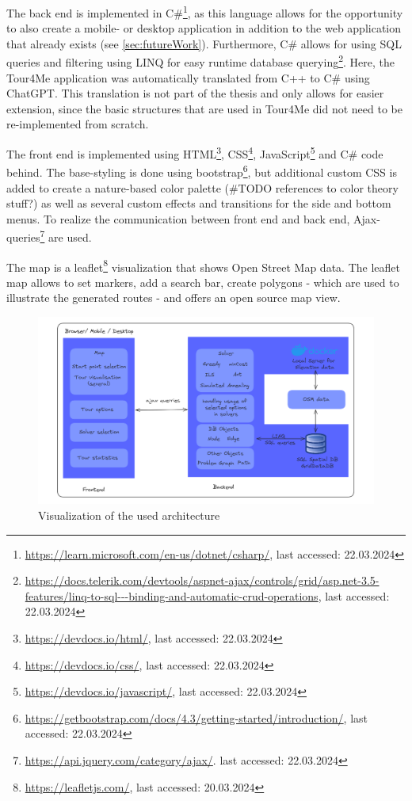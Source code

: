 The back end is implemented in C\#\footnote{\url{https://learn.microsoft.com/en-us/dotnet/csharp/}, last accessed: 22.03.2024}, as this language allows for the opportunity to also create a mobile- or desktop application in addition to the web application that already exists (see \ref{sec:futureWork}).
Furthermore, C\# allows for using SQL queries and filtering using LINQ for easy runtime database querying\footnote{\url{https://docs.telerik.com/devtools/aspnet-ajax/controls/grid/asp.net-3.5-features/linq-to-sql---binding-and-automatic-crud-operations}, last accessed: 22.03.2024}.
Here, the Tour4Me application was automatically translated from C++ to C\# using ChatGPT. 
This translation is not part of the thesis and only allows for easier extension, since the basic structures that are used in Tour4Me did not need to be re-implemented from scratch.


The front end is implemented using HTML\footnote{\url{https://devdocs.io/html/}, last accessed: 22.03.2024}, CSS\footnote{\url{https://devdocs.io/css/}, last accessed: 22.03.2024}, JavaScript\footnote{\url{https://devdocs.io/javascript/}, last accessed: 22.03.2024} and C\# code behind. 
The base-styling is done using bootstrap\footnote{\url{https://getbootstrap.com/docs/4.3/getting-started/introduction/}, last accessed: 22.03.2024}, but additional custom CSS is added to create a nature-based color palette (\#TODO references to color theory stuff?) as well as several custom effects and transitions for the side and bottom menus.
To realize the communication between front end and back end, Ajax-queries\footnote{\url{https://api.jquery.com/category/ajax/}. last accessed: 22.03.2024} are used.

The map is a leaflet\footnote{\url{https://leafletjs.com/}, last accessed: 20.03.2024} visualization that shows Open Street Map data.
The leaflet map allows to set markers, add a search bar, create polygons - which are used to illustrate the generated routes - and offers an open source map view. 


\begin{figure}[ht]
	\hspace*{-25 pt}
	\includegraphics[width=1.1\textwidth]{bilder/Implementation Architecture.png}
	\caption{Visualization of the used architecture}
	\label{fig:architecture}
\end{figure}


